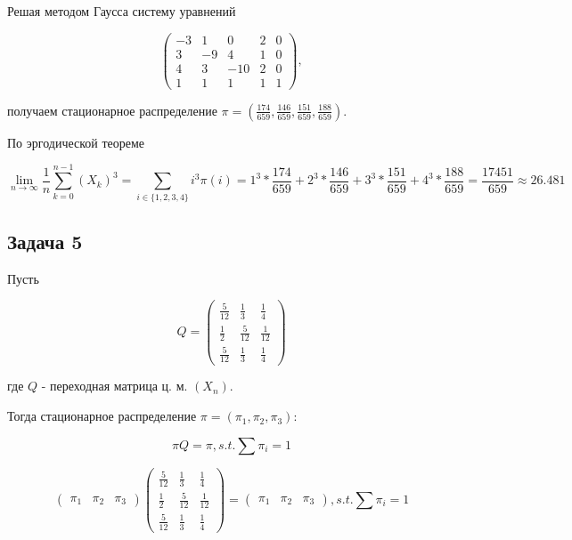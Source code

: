 \documentclass[a4paper,12pt]{article} %
\begin{document}
Решая методом Гаусса систему уравнений

$$\left(\begin{array}{cccc|c}
-3 & 1 & 0 & 2 & 0 \\
3 & -9 & 4 & 1 & 0 \\
4 & 3 & -10 & 2 & 0 \\
1 & 1 & 1 & 1 & 1
\end{array}\right),$$

получаем стационарное 
распределение   
$\pi=\left(\frac{174}{659}, 
\frac{146}{659},
\frac{151}{659},
\frac{188}{659}
\right)$.

По эргодической теореме 

$$ 
\lim_{n \to \infty } \frac{1}{n} \sum_{k=0}^{n-1}\left(X_{k}\right)^{3}  =  \sum_{i\in {\{1,2,3,4\}} } i^3  \pi(i)  =   1^{3} * \frac{174}{659}+2^{3} * \frac{146}{659}+3^{3} * \frac{151}{659}+4^{3} * \frac{188}{659}=\frac{17451}{659} \approx 26.481$$ 


  
  
\subsection*{Задача 5}
  
  
  
  Пусть
  
$$Q=\left(\begin{array}{ccc}\frac{5}{12} & \frac{1}{3} & \frac{1}{4} \\ \frac{1}{2} & \frac{5}{12} & \frac{1}{12} \\ \frac{5}{12} & \frac{1}{3} & \frac{1}{4}\end{array}\right)$$
  
  где $Q$ - переходная матрица ц. м.  $(X_n)$. 
  
  
  Тогда стационарное распределение $\pi=\left(\pi_{1}, \pi_{2}, \pi_{3}\right)$:
  
  $$\pi Q=\pi, s.t. \sum \pi_i = 1 $$
  
  $$\left(\begin{array}{lll}\pi_{1} & \pi_{2} & \pi_{3}\end{array}\right)\left(\begin{array}{ccc}\frac{5}{12} & \frac{1}{3} & \frac{1}{4} \\ \frac{1}{2} & \frac{5}{12} & \frac{1}{12} \\ \frac{5}{12} & \frac{1}{3} & \frac{1}{4}\end{array}\right)=\left(\begin{array}{lll}\pi_{1} & \pi_{2} & \pi_{3}\end{array}\right), s.t. \sum \pi_i = 1 $$
  
\end{document}
